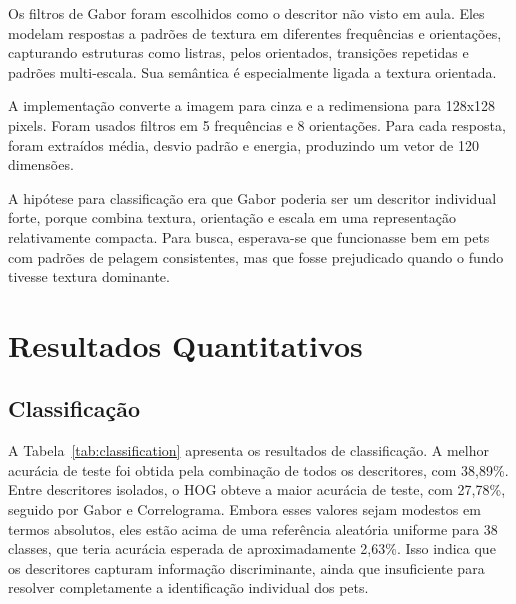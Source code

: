 \documentclass[12pt,a4paper]{article}
\begin{document}
Os filtros de Gabor foram escolhidos como o descritor não visto em aula. Eles modelam respostas a padrões de textura em diferentes frequências e orientações, capturando estruturas como listras, pelos orientados, transições repetidas e padrões multi-escala. Sua semântica é especialmente ligada a textura orientada.

A implementação converte a imagem para cinza e a redimensiona para 128x128 pixels. Foram usados filtros em 5 frequências e 8 orientações. Para cada resposta, foram extraídos média, desvio padrão e energia, produzindo um vetor de 120 dimensões.

A hipótese para classificação era que Gabor poderia ser um descritor individual forte, porque combina textura, orientação e escala em uma representação relativamente compacta. Para busca, esperava-se que funcionasse bem em pets com padrões de pelagem consistentes, mas que fosse prejudicado quando o fundo tivesse textura dominante.

\section{Resultados Quantitativos}

\subsection{Classificação}

A Tabela~\ref{tab:classification} apresenta os resultados de classificação. A melhor acurácia de teste foi obtida pela combinação de todos os descritores, com 38,89\%. Entre descritores isolados, o HOG obteve a maior acurácia de teste, com 27,78\%, seguido por Gabor e Correlograma. Embora esses valores sejam modestos em termos absolutos, eles estão acima de uma referência aleatória uniforme para 38 classes, que teria acurácia esperada de aproximadamente 2,63\%. Isso indica que os descritores capturam informação discriminante, ainda que insuficiente para resolver completamente a identificação individual dos pets.
\end{document}
